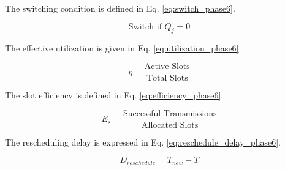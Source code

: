 \documentclass[a4paper,fleqn]{cas-dc}
\numberwithin{equation}{section}
\begin{document}
The switching condition is defined in Eq. \ref{eq:switch_phase6}.

\begin{equation}
\text{Switch if } Q_j = 0
\label{eq:switch_phase6}
\end{equation}

The effective utilization is given in Eq. \ref{eq:utilization_phase6}.

\begin{equation}
\eta = \frac{\text{Active Slots}}{\text{Total Slots}}
\label{eq:utilization_phase6}
\end{equation}

The slot efficiency is defined in Eq. \ref{eq:efficiency_phase6}.

\begin{equation}
E_s = \frac{\text{Successful Transmissions}}{\text{Allocated Slots}}
\label{eq:efficiency_phase6}
\end{equation}

The rescheduling delay is expressed in Eq. \ref{eq:reschedule_delay_phase6}.

\begin{equation}
D_{reschedule} = T_{new} - T
\label{eq:reschedule_delay_phase6}
\end{equation}
\end{document}
